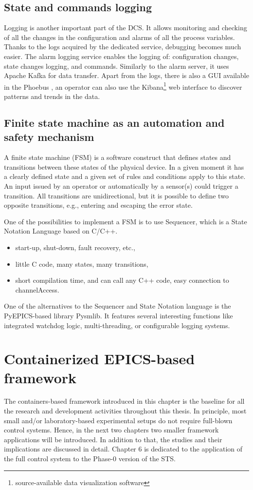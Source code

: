 \subsection{State and commands logging}
Logging is another important part of the \gls{DCS}. It allows monitoring and checking of all the changes in the configuration and alarms of all the process variables. Thanks to the logs acquired by the dedicated service, debugging becomes much easier. The alarm logging service enables the logging of: configuration changes, state changes logging, and commands. Similarly to the alarm server, it uses Apache Kafka for data transfer. Apart from the logs, there is also a \gls{GUI} available in the Phoebus \cite{alarm_logger}, an operator can also use the Kibana\footnote{source-available data visualization software} web interface to discover patterns and trends in the data. 

\subsection{Finite state machine as an automation and safety mechanism}
A finite state machine (\gls{FSM}) is a software construct that defines states and transitions between these states of the physical device. In a given moment it has a clearly defined state and a given set of rules and conditions apply to this state. An input issued by an operator or automatically by a sensor(s) could trigger a transition. All transitions are unidirectional, but it is possible to define two opposite transitions, e.g., entering and escaping the error state. 

One of the possibilities to implement a \gls{FSM} is to use Sequencer, which is a State Notation Language based on C/C++. 
\begin{itemize}
    \item start-up, shut-down, fault recovery, etc.,
    \item little C code, many states, many transitions,
    \item short compilation time, and can call any C++ code, easy connection to channelAccess.
\end{itemize}

One of the alternatives to the Sequencer and State Notation language is the PyEPICS-based library Pysmlib\cite{pysmlib}. It features several interesting functions like integrated watchdog logic, multi-threading, or configurable logging systems.


\section{Containerized EPICS-based framework}

The containers-based framework introduced in this chapter is the baseline for all the research and development activities throughout this thesis. In principle, most small and/or laboratory-based experimental setups do not require full-blown control systems. Hence, in the next two chapters two smaller framework applications will be introduced. In addition to that, the studies and their implications are discussed in detail. Chapter 6 is dedicated to the application of the full control system to the Phase-0 version of the \gls{STS}.